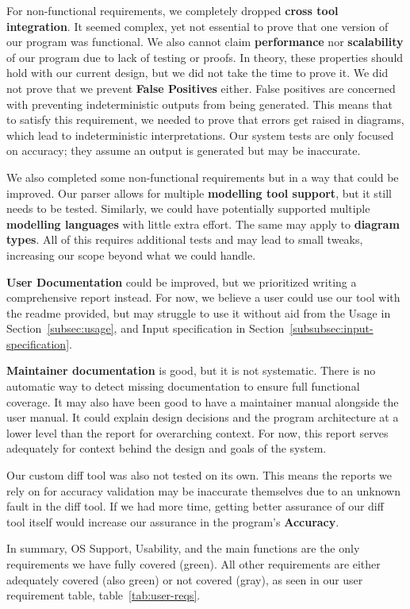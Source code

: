 For non-functional requirements, we completely dropped \textbf{cross tool integration}.
It seemed complex, yet not essential to prove that one version of our program was functional.
We also cannot claim \textbf{performance} nor \textbf{scalability} of our program due to lack of testing or proofs.
In theory, these properties should hold with our current design, but we did not take the time to prove it.
We did not prove that we prevent \textbf{False Positives} either.
False positives are concerned with preventing indeterministic outputs from being generated.
This means that to satisfy this requirement, we needed to prove that errors get raised in diagrams, which lead to indeterministic interpretations.
Our system tests are only focused on accuracy; they assume an output is generated but may be inaccurate.

We also completed some non-functional requirements but in a way that could be improved.
Our parser allows for multiple \textbf{modelling tool support}, but it still needs to be tested.
Similarly, we could have potentially supported multiple \textbf{modelling languages} with little extra effort.
The same may apply to \textbf{diagram types}.
All of this requires additional tests and may lead to small tweaks, increasing our scope beyond what we could handle.

\textbf{User Documentation} could be improved, but we prioritized writing a comprehensive report instead.
For now, we believe a user could use our tool with the readme provided,
but may struggle to use it without aid from the Usage in Section~\ref{subsec:usage}, and Input specification in Section~\ref{subsubsec:input-specification}.

\textbf{Maintainer documentation} is good, but it is not systematic.
There is no automatic way to detect missing documentation to ensure full functional coverage.
It may also have been good to have a maintainer manual alongside the user manual.
It could explain design decisions and the program architecture at a lower level than the report for overarching context.
For now, this report serves adequately for context behind the design and goals of the system.

Our custom diff tool was also not tested on its own.
This means the reports we rely on for accuracy validation may be inaccurate themselves due to an unknown fault in the diff tool.
If we had more time, getting better assurance of our diff tool itself would increase our assurance in the program's
\textbf{Accuracy}.

In summary, OS Support, Usability, and the main functions are the only requirements we have fully covered (green).
All other requirements are either adequately covered (also green) or not covered (gray),
as seen in our user requirement table, table~\ref{tab:user-reqs}.


